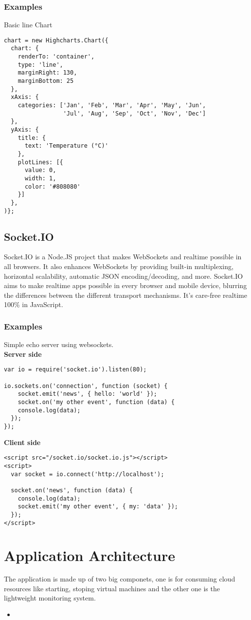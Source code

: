 \subsubsection{Examples}
Basic line Chart
\begin{verbatim}
chart = new Highcharts.Chart({
  chart: {
    renderTo: 'container',
    type: 'line',
    marginRight: 130,
    marginBottom: 25
  },
  xAxis: {
    categories: ['Jan', 'Feb', 'Mar', 'Apr', 'May', 'Jun',
                 'Jul', 'Aug', 'Sep', 'Oct', 'Nov', 'Dec']
  },
  yAxis: {
    title: {
      text: 'Temperature (°C)'
    },
    plotLines: [{
      value: 0,
      width: 1,
      color: '#808080'
    }]
  },
)};  
\end{verbatim}
\subsection{Socket.IO}
Socket.IO is a Node.JS project that makes WebSockets and realtime possible in all browsers. It also enhances 
WebSockets by providing built-in multiplexing, horizontal scalability, automatic JSON encoding/decoding, and more.
Socket.IO aims to make realtime apps possible in every browser and mobile device, blurring the differences between 
the different transport mechanisms. It's care-free realtime 100\% in JavaScript.
\clearpage
\subsubsection{Examples}
Simple echo server using websockets.\\
{\bf Server side}
\begin{verbatim}
var io = require('socket.io').listen(80);

io.sockets.on('connection', function (socket) {
    socket.emit('news', { hello: 'world' });
    socket.on('my other event', function (data) {
    console.log(data);
  });
});
\end{verbatim}
{\bf Client side}
\begin{verbatim}
<script src="/socket.io/socket.io.js"></script>
<script>
  var socket = io.connect('http://localhost');
  
  socket.on('news', function (data) {
    console.log(data);
    socket.emit('my other event', { my: 'data' });
  });
</script>
\end{verbatim}
\section{Application Architecture}
The application is made up of two big componets, one is for consuming cloud resources like starting, stoping virtual 
machines and the other one is the lightweight monitoring system.
\begin{itemize}
  \item 
\end{itemize}